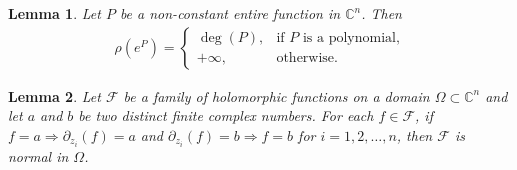 \documentclass[11pt, reqno]{amsart}
\newtheorem*{cor A}{Corollary A}
\newtheorem*{cor B}{Corollary B}
\newtheorem{lem}{Lemma}[section]
\numberwithin{equation}{section}
\begin{document}
\begin{lem}\label{ln2.6}\cite[Lemma 3.59]{Hu-Li-Yang-2003} Let $P$ be a non-constant entire function in $\mathbb{C}^n$. Then 
\begin{align*}
\rho(e^P)=
\begin{cases}
\deg(P), & \text{if $P$ is a polynomial,}\\
+\infty, & \text{otherwise.}
\end{cases}
\end{align*}
\end{lem}

\begin{lem}\label{ln2.3a} Let $\mathcal{F}$ be a family of holomorphic functions on a domain $\Omega\subset \mathbb{C}^n$ and let $a$ and $b$ be two distinct finite complex numbers. For each $f\in \mathcal{F}$, if $f=a\Rightarrow \partial_{z_i}(f)=a$ and $\partial_{z_i}(f)=b\Rightarrow f=b$ for $i=1,2,\ldots,n$, then $\mathcal{F}$ is normal in $\Omega$.
\end{lem}
\end{document}
